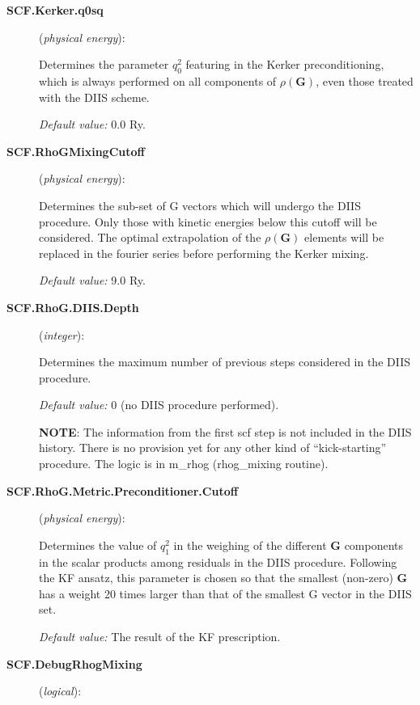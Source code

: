 \begin{description}

\item[\textbf{SCF.Kerker.q0sq}] (\textit{physical energy}):

Determines the parameter $q_0^2$ featuring in the Kerker
preconditioning, which is always performed on all components of
$\rho(\textbf{G})$, even those treated with the DIIS scheme. 

\textit{Default value:} 0.0 Ry.

\item[\textbf{SCF.RhoGMixingCutoff}] (\textit{physical energy}):

Determines the sub-set of G vectors which will undergo the DIIS
procedure.  Only those with kinetic energies below this cutoff will be
considered.  The optimal extrapolation of the $\rho(\textbf{G})$ elements will be
replaced in the fourier series before performing the Kerker
mixing.

\textit{Default value:} 9.0 Ry.

\item[\textbf{SCF.RhoG.DIIS.Depth}] (\textit{integer}):

Determines the maximum number of previous steps considered in the DIIS
procedure. 

\textit{Default value:} 0 (no DIIS procedure performed).

\textbf{NOTE}: The information from the first scf step is not included in
the DIIS history. There is no provision yet for any other kind of
``kick-starting'' procedure. The logic is in m\_rhog (rhog\_mixing routine).

\item[\textbf{SCF.RhoG.Metric.Preconditioner.Cutoff}] (\textit{physical energy}):

Determines the value of $q_1^2$ in the weighing of the different \textbf{G}
components in the scalar products among residuals in the DIIS
procedure. Following the KF ansatz, this parameter is chosen so that
the smallest (non-zero) \textbf{G} has a weight 20 times larger than that of
the smallest G vector in the DIIS set. 

\textit{Default value:} The result of the KF prescription.

\item[\textbf{SCF.DebugRhogMixing}] (\textit{logical}):


\end{description}

